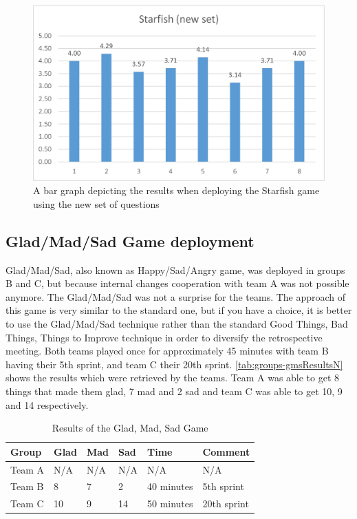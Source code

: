 \begin{figure}[!htbp]
\caption{A bar graph depicting the results when deploying the Starfish game using the new set of questions}
\label{fig:starfishResultsNew}
\centering
\includegraphics[width=1\textwidth]{charts/starfishNewSet}
\end{figure}

\subsection{Glad/Mad/Sad Game deployment}

Glad/Mad/Sad, also known as Happy/Sad/Angry game, was deployed in groups B and C, but because internal changes cooperation with team A was not possible anymore. The Glad/Mad/Sad was not a surprise for the teams. The approach of this game is very similar to the standard one, but if you have a choice, it is better to use the Glad/Mad/Sad technique rather than the standard Good Things, Bad Things, Things to Improve technique in order to diversify the retrospective meeting. Both teams played once for approximately 45 minutes with team B having their 5th sprint, and team C their 20th sprint. \autoref{tab:groups-gmsResultsN} shows the results which were retrieved by the teams. Team A was able to get 8 things that made them glad, 7 mad and 2 sad and team C was able to get 10, 9 and 14 respectively.

\begin{table}[!htbp]
	\caption{Results of the Glad, Mad, Sad Game}
	\label{tab:groups-gmsResultsN}
	\begin{tabularx}{\textwidth}{|X|X|X|X|X|X|}
	\hline
		Group & Glad & Mad & Sad & Time & Comment\\ \hline
		Team A & N/A & N/A & N/A & N/A & N/A\\ \hline
		Team B & 8 & 7 & 2 & 40 minutes & 5th sprint\\ \hline
        Team C & 10 & 9 & 14 & 50 minutes & 20th sprint\\ \hline
	\end{tabularx}
\end{table}

